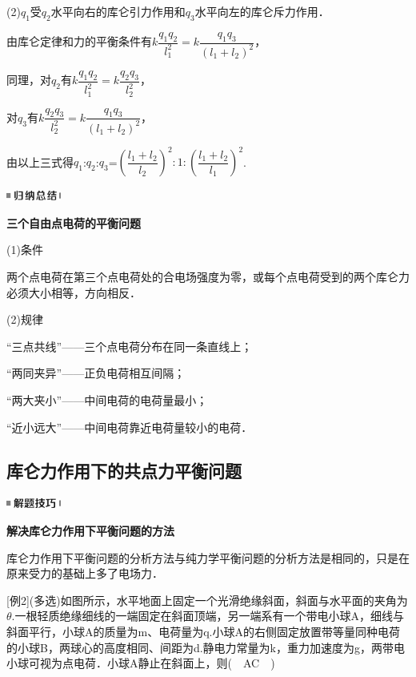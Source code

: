 (2)$q_1$受$q_2$水平向右的库仑引力作用和$q_3$水平向左的库仑斥力作用．

由库仑定律和力的平衡条件有$k\dfrac{q_1q_2}{l_1^2}=k\dfrac{q_1q_3}{(l_1+l_2)^2}$，

同理，对$q_2$有$k\dfrac{q_1q_2}{l_1^2}=k\dfrac{q_2q_3}{l_2^2}$，

对$q_3$有$k\dfrac{q_2q_3}{l_2^2}=k\dfrac{q_1q_3}{(l_1+l_2)^2}$，

由以上三式得$q_1$:$q_2$:$q_3$=$(\dfrac{l_1+l_2}{l_2} )^2:1:(\dfrac{l_1+l_2}{l_1} )^2$.

\begin{center}\includegraphics[width=0.70833in,height=0.125in]{media/image13.png}

\textbf{三个自由点电荷的平衡问题}
\end{center}


(1)条件

两个点电荷在第三个点电荷处的合电场强度为零，或每个点电荷受到的两个库仑力必须大小相等，方向相反．

(2)规律

``三点共线''------三个点电荷分布在同一条直线上；

``两同夹异''------正负电荷相互间隔；

``两大夹小''------中间电荷的电荷量最小；

``近小远大''------中间电荷靠近电荷量较小的电荷．
\newpage
\subsection{库仑力作用下的共点力平衡问题}

\begin{center}\includegraphics[width=0.70833in,height=0.125in]{media/image37.png}

\textbf{解决库仑力作用下平衡问题的方法}
\end{center}


库仑力作用下平衡问题的分析方法与纯力学平衡问题的分析方法是相同的，只是在原来受力的基础上多了电场力．

{[}例2{]}(多选)如图所示，水平地面上固定一个光滑绝缘斜面，斜面与水平面的夹角为$\theta$.一根轻质绝缘细线的一端固定在斜面顶端，另一端系有一个带电小球A，细线与斜面平行，小球A的质量为m、电荷量为q.小球A的右侧固定放置带等量同种电荷的小球B，两球心的高度相同、间距为d.静电力常量为k，重力加速度为g，两带电小球可视为点电荷．小球A静止在斜面上，则(　AC　)

